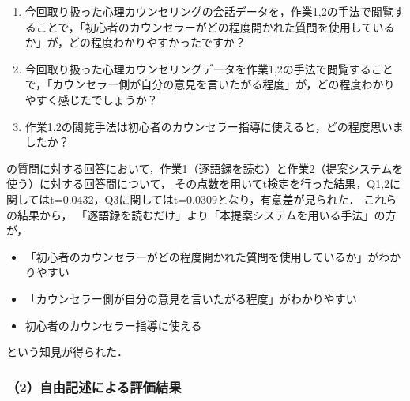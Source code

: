 \documentclass[shuuron]{kuee}
\begin{document}
\begin{enumerate}

  \item 今回取り扱った心理カウンセリングの会話データを，作業1,2の手法で閲覧することで，「初心者のカウンセラーがどの程度開かれた質問を使用しているか」が，どの程度わかりやすかったですか？
  \item 今回取り扱った心理カウンセリングデータを作業1,2の手法で閲覧することで，「カウンセラー側が自分の意見を言いたがる程度」が，どの程度わかりやすく感じたでしょうか？
  \item 作業1,2の閲覧手法は初心者のカウンセラー指導に使えると，どの程度思いましたか？
\end{enumerate}
の質問に対する回答において，作業1（逐語録を読む）と作業2（提案システムを使う）に対する回答間について，
その点数を用いてt検定を行った結果，Q1,2に関してはt=0.0432，Q3に関してはt=0.0309となり，有意差が見られた．
これらの結果から，
「逐語録を読むだけ」より「本提案システムを用いる手法」の方が，
\begin{itemize}
  \item 「初心者のカウンセラーがどの程度開かれた質問を使用しているか」がわかりやすい
  \item 「カウンセラー側が自分の意見を言いたがる程度」がわかりやすい
  \item 初心者のカウンセラー指導に使える
\end{itemize}
という知見が得られた．


\subsubsection{（2）自由記述による評価結果}
%
%
%
%
%




\end{document}
